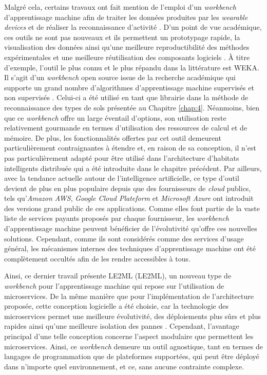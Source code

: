 Malgré cela, certains travaux ont fait mention de l'emploi d'un \textit{workbench} d'apprentissage machine afin de traiter les données produites par les \textit{wearable devices} et de réaliser la reconnaissance d'activité \citep{Chapron2018}. D'un point de vue académique, ces outils ne sont pas nouveaux et ils permettent un prototypage rapide, la visualisation des données ainsi qu'une meilleure reproductibilité des méthodes expérimentales et une meilleure réutilisation des composants logiciels \citep{Holmes1994,Langlois2008}. À titre d'exemple, l'outil le plus connu et le plus répandu dans la littérature est \acs{WEKA}. Il s'agit d'un \textit{workbench} open source issue de la recherche académique qui supporte un grand nombre d'algorithmes d'apprentissage machine supervisés et non supervisés \citep{Witten2016}. Celui-ci a été utilisé en tant que librairie dans la méthode de reconnaissance des types de sols présentée au Chapitre \ref{chap:4}. Néanmoins, bien que ce \textit{workbench} offre un large éventail d'options, son utilisation reste relativement gourmande en termes d'utilisation des ressources de calcul et de mémoire. De plus, les fonctionnalités offertes par cet outil demeurent particulièrement contraignantes à étendre et, en raison de sa conception, il n'est pas particulièrement adapté pour être utilisé dans l'architecture d'habitats intelligents distribuée qui a été introduite dans le chapitre précédent. Par ailleurs, avec la tendance actuelle autour de l'intelligence artificielle, ce type d'outil devient de plus en plus populaire depuis que des fournisseurs de \textit{cloud} publics, tels qu'\textit{Amazon AWS}, \textit{Google Cloud Plateform} et \textit{Microsoft Azure} ont introduit des versions grand public de ces applications. Comme elles font partie de la vaste liste de services payants proposés par chaque fournisseur, les \textit{workbench} d'apprentissage machine peuvent bénéficier de l'évolutivité qu'offre ces nouvelles solutions. Cependant, comme ils sont considérés comme des services d'usage général, les mécanismes internes des techniques d'apprentissage machine ont été complètement occultés afin de les rendre accessibles à tous.

Ainsi, ce dernier travail présente \acs{LE2ML} (\acl{LE2ML}), un nouveau type de \textit{workbench} pour l'apprentissage machine qui repose sur l'utilisation de microservices. De la même manière que pour l'implémentation de l'architecture proposée, cette conception logicielle a été choisie, car la technologie des microservices permet une meilleure évolutivité, des déploiements plus sûrs et plus rapides ainsi qu'une meilleure isolation des pannes \citep{Dragoni2017}. Cependant, l'avantage principal d'une telle conception concerne l'aspect modulaire que permettent les microservices. Ainsi, ce \textit{workbench} demeure un outil agnostique, tant en termes de langages de programmation que de plateformes supportées, qui peut être déployé dans n'importe quel environnement, et ce, sans aucune contrainte complexe.


